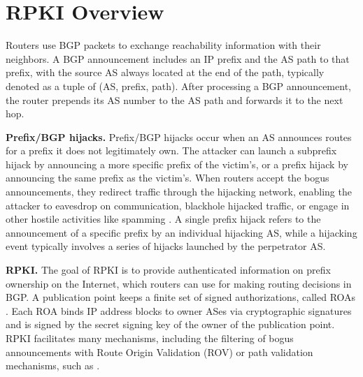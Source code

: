 \vspace{-10pt}
\section{RPKI Overview} \label{sec:background}

Routers use BGP packets to exchange reachability information with their neighbors. A BGP announcement includes an IP prefix and the AS path to that prefix, with the source AS always located at the end of the path, typically denoted as a tuple of (AS, prefix, path). %
After processing a BGP announcement, the router prepends its AS number to the AS path and forwards it to the next hop.

{\bf Prefix/BGP hijacks.} Prefix/BGP hijacks occur when an AS announces routes for a prefix it does not legitimately own. The attacker can launch a subprefix hijack by announcing a more specific prefix of the victim's, or a prefix hijack by announcing the same prefix as the victim's.
When routers accept the bogus announcements, they redirect traffic through the hijacking network, enabling the attacker to eavesdrop on communication, blackhole hijacked traffic, or engage in other hostile activities like spamming \cite{ballani2007study,vervier2015mind,vervier2013spamtracer}.
A single prefix hijack refers to the announcement of a specific prefix by an individual hijacking AS, while a hijacking event typically involves a series of hijacks launched by the perpetrator AS.

{\bf RPKI.} The goal of RPKI is to provide authenticated information on prefix ownership on the Internet, which routers can use for making routing decisions in BGP. %
A publication point keeps a finite set of signed authorizations, called ROAs \cite{rfc6480}. %
Each ROA binds IP address blocks to owner ASes via cryptographic signatures and is signed by the secret signing key of the owner of the publication point. %
RPKI facilitates many mechanisms, including the filtering of bogus announcements with Route Origin Validation (ROV) or path validation mechanisms, such as \cite{aspa,rsc,rfc8205}.

